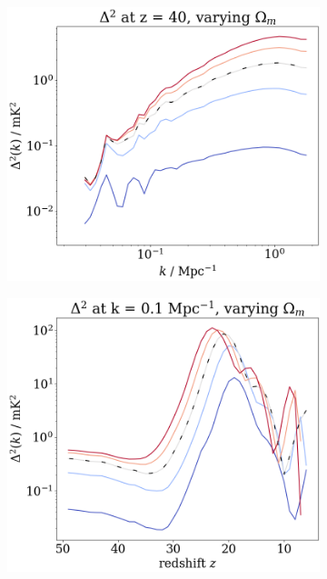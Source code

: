 \documentclass[floats,floatfix,showpacs,amssymb,prd,superscriptaddress,nofootinbib]{revtex4-2} %
\begin{document}
\begin{figure}[H]
\begin{subfigure}[b]{0.45\textwidth}
         \includegraphics[width=\textwidth]{images/simulation_results/power_spectrum_fixed_z_40_Om.png}
         \label{fig:power_spectrum_fixed_z_40_Om}
     \end{subfigure}
     \hfill
     \begin{subfigure}[b]{0.45\textwidth}
         \centering
         \includegraphics[width=\textwidth]{images/simulation_results/power_spectrum_fixed_k_0.1_Om.png}
         \label{fig:power_spectrum_fixed_k_0.1_Om}

\end{subfigure}
\end{figure}
\end{document}
